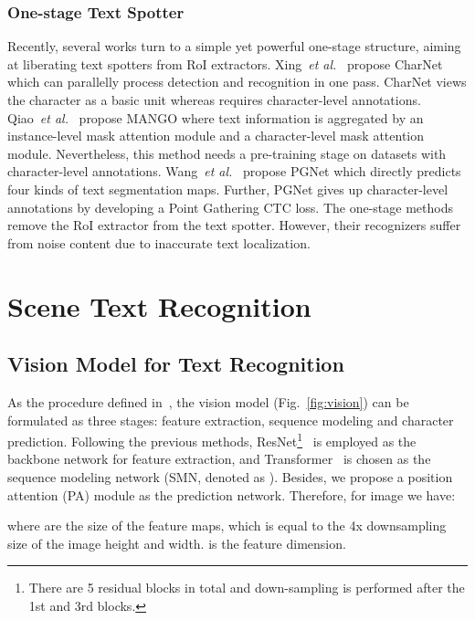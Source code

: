 \documentclass[10pt,journal,compsoc]{IEEEtran}
\def\etal{{\it et al.}\xspace}
\begin{document}
\subsubsection{One-stage Text Spotter}

Recently, several works turn to a simple yet powerful one-stage structure, aiming at liberating text spotters from RoI extractors. Xing~\etal~\cite{xing2019convolutional} propose CharNet which can parallelly process detection and recognition in one pass. CharNet views the character as a basic unit whereas requires character-level annotations. Qiao~\etal~\cite{qiao2021mango} propose MANGO where text information is aggregated by an instance-level mask attention module and a character-level mask attention module. Nevertheless, this method needs a pre-training stage on datasets with character-level annotations. Wang~\etal~\cite{wang2021pgnet} propose PGNet which directly predicts four kinds of text segmentation maps. Further, PGNet gives up character-level annotations by developing a Point Gathering CTC loss. The one-stage methods remove the RoI extractor from the text spotter. However, their recognizers suffer from noise content due to inaccurate text localization.




\section{Scene Text Recognition}
\label{sec:str}

\subsection{Vision Model for Text Recognition}
\label{sec:vision}

As the procedure defined in~\cite{baek2019wrong}, the vision model (Fig.~\ref{fig:vision}) can be formulated as three stages: feature extraction, sequence modeling and character prediction. Following the previous methods, ResNet\footnote{There are 5 residual blocks in total and down-sampling is performed after the 1st and 3rd blocks.}~\cite{shi2018aster, wang2020decoupled} is employed as the backbone network  for feature extraction, and Transformer~\cite{yu2020towards, lyu20192d} is chosen as the sequence modeling network (SMN, denoted as ). Besides, we propose a position attention (PA) module as the prediction network. Therefore, for image  we have:

where  are the size of the feature maps, which is equal to the 4x downsampling size of the image height and width.  is the feature dimension.
\end{document}
